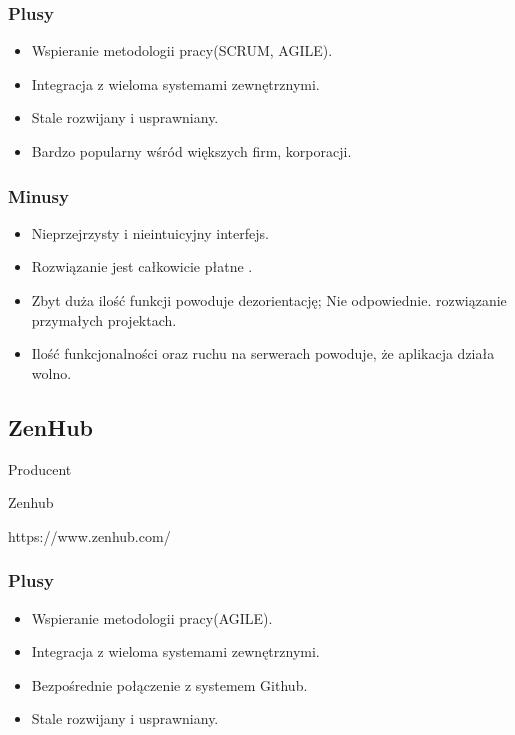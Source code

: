 \documentclass[eng,printmode]{mgr}
\begin{document}
\subsubsection{Plusy}
\begin{itemize}
  \item[--] Wspieranie metodologii pracy(SCRUM, AGILE).
  \item[--] Integracja z wieloma systemami zewnętrznymi.
  \item[--] Stale rozwijany i usprawniany.
  \item[--] Bardzo popularny wśród większych firm, korporacji.
\end{itemize}
\subsubsection{Minusy}
\begin{itemize}
  \item[--] Nieprzejrzysty i nieintuicyjny interfejs.
  \item[--] Rozwiązanie jest całkowicie płatne .
  \item[--] Zbyt duża ilość funkcji powoduje dezorientację; Nie odpowiednie. rozwiązanie przymałych projektach.
  \item[--] Ilość funkcjonalności oraz ruchu na serwerach powoduje, że aplikacja działa wolno.
\end{itemize}

\subsection{ZenHub}
\begin{labeling}{Producent}
\item [Producent:] Zenhub
\item [Link:] https://www.zenhub.com/
\end{labeling}
\subsubsection{Plusy}
\begin{itemize}
  \item[--] Wspieranie metodologii pracy(AGILE).
  \item[--] Integracja z wieloma systemami zewnętrznymi.
  \item[--] Bezpośrednie połączenie z systemem Github.
  \item[--] Stale rozwijany i usprawniany.
\end{itemize}
\end{document}

